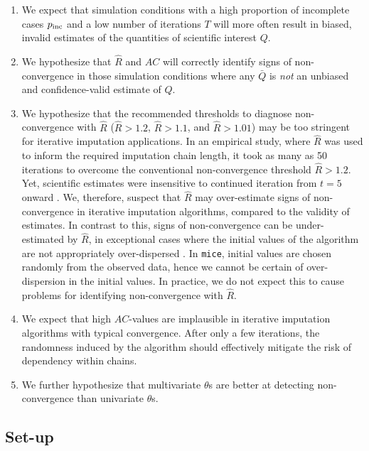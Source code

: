 \documentclass[Royal,times,sageh]{sagej}
\begin{document}
\begin{enumerate}
\def\labelenumi{\arabic{enumi}.}
\item
  We expect that simulation conditions with a high proportion of incomplete cases \(p_{\rm inc}\) and a low number of iterations \(T\) will more often result in biased, invalid estimates of the quantities of scientific interest \(Q\).
\item
  We hypothesize that \(\widehat{R}\) and \(AC\) will correctly identify signs of non-convergence in those simulation conditions where any \(\bar{Q}\) is \emph{not} an unbiased and confidence-valid estimate of \(Q\).
\item
  We hypothesize that the recommended thresholds to diagnose non-convergence with \(\widehat{R}\) (\(\widehat{R} > 1.2\), \(\widehat{R} > 1.1\), and \(\widehat{R} > 1.01\)) may be too stringent for iterative imputation applications. In an empirical study, where \(\widehat{R}\) was used to inform the required imputation chain length, it took as many as 50 iterations to overcome the conventional non-convergence threshold \(\widehat{R}>1.2\). Yet, scientific estimates were insensitive to continued iteration from \(t=5\) onward \citep{lace07}. We, therefore, suspect that \(\widehat{R}\) may over-estimate signs of non-convergence in iterative imputation algorithms, compared to the validity of estimates. In contrast to this, signs of non-convergence can be under-estimated by \(\widehat{R}\), in exceptional cases where the initial values of the algorithm are not appropriately over-dispersed \citep[p.~437]{broo98}. In \texttt{mice}, initial values are chosen randomly from the observed data, hence we cannot be certain of over-dispersion in the initial values. In practice, we do not expect this to cause problems for identifying non-convergence with \(\widehat{R}\).
\item
  We expect that high \(AC\)-values are implausible in iterative imputation algorithms with typical convergence. After only a few iterations, the randomness induced by the algorithm should effectively mitigate the risk of dependency within chains.
\item
  We further hypothesize that multivariate \(\theta\)s are better at detecting non-convergence than univariate \(\theta\)s.
\end{enumerate}

\hypertarget{set-up}{%
\subsection{Set-up}\label{set-up}}
\end{document}
